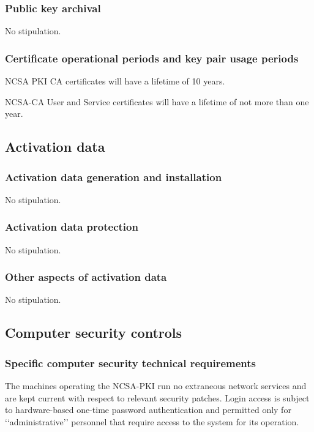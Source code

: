 \documentclass[10pt]{article}
\begin{document}
\subsubsection{Public key archival}

No stipulation.

\subsubsection{Certificate operational periods and key pair usage periods}

NCSA PKI CA certificates will have a lifetime of 10 years.

NCSA-CA User and Service certificates will have a lifetime of not more
than one year.

\subsection{Activation data}
\subsubsection{Activation data generation and installation}

No stipulation.

\subsubsection{Activation data protection}

No stipulation.

\subsubsection{Other aspects of activation data}

No stipulation.

\subsection{Computer security controls}
\subsubsection{Specific computer security technical requirements}

The machines operating the NCSA-PKI run no extraneous network services
and are kept current with respect to relevant security patches. Login
access is subject to hardware-based one-time password authentication
and permitted only for ‘‘administrative’’ personnel that require
access to the system for its operation.
\end{document}
